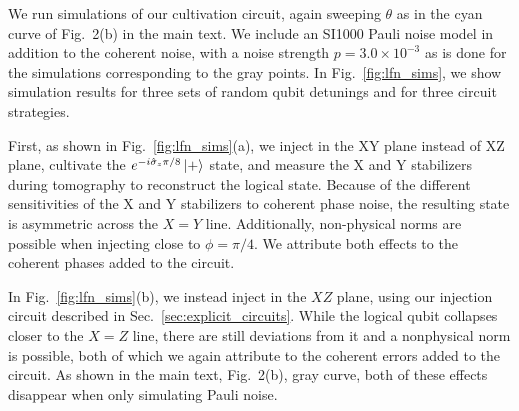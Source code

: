 We run simulations of our cultivation circuit, again sweeping $\theta$ as in the cyan curve of Fig.~2(b) in the main text. We include an SI1000 Pauli noise model in addition to the coherent noise, with a noise strength $p = 3.0 \times 10^{-3}$ as is done for the simulations corresponding to the gray points. In Fig.~\ref{fig:lfn_sims}, we show simulation results for three sets of random qubit detunings and for three circuit strategies. 

First, as shown in Fig.~\ref{fig:lfn_sims}(a), we inject in the XY plane instead of XZ plane, cultivate the $e^{-i\hat{\sigma}_z \pi/8} \ket{+}$ state, and measure the X and Y stabilizers during tomography to reconstruct the logical state. Because of the different sensitivities of the X and Y stabilizers to coherent phase noise, the resulting state is asymmetric across the $X = Y$ line. Additionally, non-physical norms are possible when injecting close to $\phi = \pi/4$. We attribute both effects to the coherent phases added to the circuit.

In Fig.~\ref{fig:lfn_sims}(b), we instead inject in the $XZ$ plane, using our injection circuit described in Sec.~\ref{sec:explicit_circuits}. While the logical qubit collapses closer to the $X=Z$ line, there are still deviations from it and a nonphysical norm is possible, both of which we again attribute to the coherent errors added to the circuit. As shown in the main text, Fig.~2(b), gray curve, both of these effects disappear when only simulating Pauli noise.

